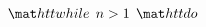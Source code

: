 \documentclass[preview]{standalone}
\begin{document}
\begin{align*}
\mat h tt{ w h i l e } \:\: n > 1 \:\: \mat h tt{do}
\end{align*}
\end{document}
